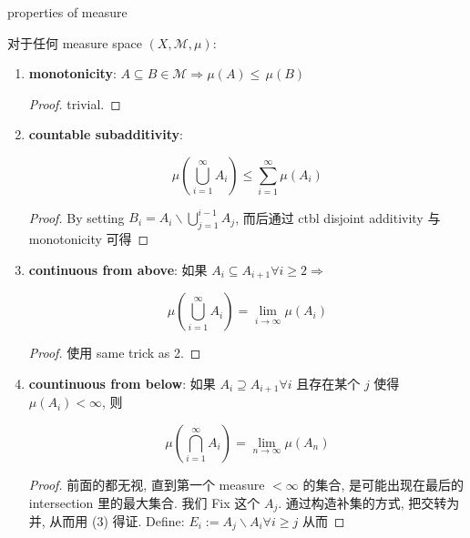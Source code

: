 \documentclass{qlnotes-export}
\begin{document}
\begin{theorem}{properties of measure}\label{thm-01-sigma-algebra-measure-properties-of-measure-2}

对于任何 measure space \((X,\mathcal{M},\mu)\):

\begin{enumerate}
\item
  \textbf{monotonicity}: \(A \subseteq B \in \mathcal{M}\Longrightarrow\mu(A) \leq \,\mu(B)\)

  \begin{proof}

  trivial.

  \end{proof}
\item
  \textbf{countable subadditivity}:

  \[\mu(\bigcup\limits_{i = 1}^{\infty}A_{i}) \leq \sum\limits_{i = 1}^{\infty}\mu(A_{i})\]

  \begin{proof}

  By setting \(B_{i} = A_{i}\backslash\bigcup_{j = 1}^{i - 1}A_{j}\), 而后通过 ctbl disjoint additivity 与 monotonicity 可得

  \end{proof}
\item
  \textbf{continuous from above}: 如果 \(A_{i} \subseteq A_{i + 1}\forall i \geq 2\Longrightarrow\)

  \[\mu(\bigcup\limits_{i = 1}^{\infty}A_{i}) = \lim\limits_{i\rightarrow\infty}\mu(A_{i})\]

  \begin{proof}

  使用 same trick as 2.

  \end{proof}
\item
  \textbf{countinuous from below}: 如果 \(A_{i} \supseteq A_{i + 1}\forall i\) 且存在某个 \(j\) 使得 \(\mu(A_{i}) < \infty\), 则

  \[\mu(\bigcap\limits_{i = 1}^{\infty}A_{i}) = \lim\limits_{n\rightarrow\infty}\mu(A_{n})\]

  \begin{proof}

  前面的都无视, 直到第一个 measure \(< \infty\) 的集合, 是可能出现在最后的 intersection 里的最大集合. 我们 Fix 这个 \(A_{j}\). 通过构造补集的方式, 把交转为并, 从而用 (3) 得证. Define: \(E_{i} := A_{j}\backslash A_{i}\forall i \geq j\) 从而


\end{proof}
\end{enumerate}
\end{theorem}
\end{document}
